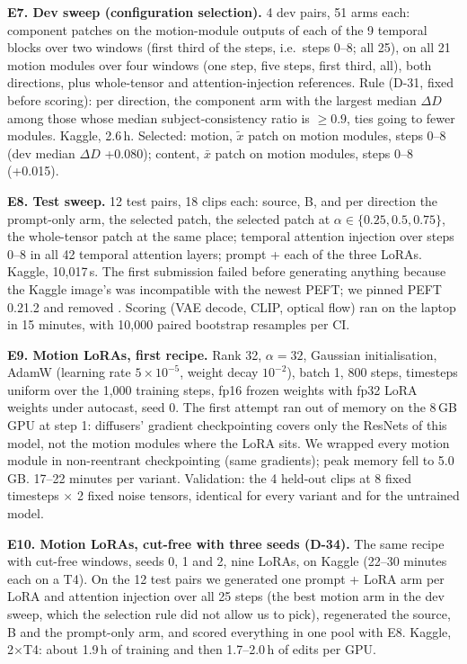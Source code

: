 \documentclass[twoside,english]{article}
\newcommand{\xs}{\bar{x}}         %
\newcommand{\xd}{\tilde{x}}       %
\newcommand{\dD}{\Delta D}
\begin{document}
\textbf{E7. Dev sweep (configuration selection).} 4 dev pairs, 51 arms each: component patches on
the motion-module outputs of each of the 9 temporal blocks over two windows (first third of the
steps, i.e.\ steps 0--8; all 25), on all 21 motion modules over four windows (one step, five steps,
first third, all), both directions, plus whole-tensor and attention-injection references. Rule
(D-31, fixed before scoring): per direction, the component arm with the largest median $\dD$
among those whose median subject-consistency ratio is $\ge 0.9$, ties going to fewer modules.
Kaggle, 2.6\,h. Selected: motion, $\xd$ patch on  motion modules, steps 0--8
(dev median $\dD$ +0.080); content, $\xs$ patch on  motion modules, steps
0--8 (+0.015).

\textbf{E8. Test sweep.} 12 test pairs, 18 clips each: source, B, and per direction the prompt-only
arm, the selected patch, the selected patch at $\alpha \in \{0.25, 0.5, 0.75\}$, the whole-tensor
patch at the same place; temporal attention injection over steps 0--8 in all 42 temporal attention
layers; prompt + each of the three LoRAs. Kaggle, 10{,}017\,s. The first submission failed before
generating anything because the Kaggle image's  was incompatible with the newest PEFT;
we pinned PEFT 0.21.2 and removed . Scoring (VAE decode, CLIP, optical flow) ran on the
laptop in 15 minutes, with 10{,}000 paired bootstrap resamples per CI.

\textbf{E9. Motion LoRAs, first recipe.} Rank 32, $\alpha=32$, Gaussian initialisation, AdamW
(learning rate $5\times10^{-5}$, weight decay $10^{-2}$), batch 1, 800 steps, timesteps uniform over
the 1{,}000 training steps, fp16 frozen weights with fp32 LoRA weights under autocast, seed 0. The
first attempt ran out of memory on the 8\,GB GPU at step 1: diffusers' gradient checkpointing
covers only the ResNets of this model, not the motion modules where the LoRA sits. We wrapped every
motion module in non-reentrant checkpointing (same gradients); peak memory fell to 5.0\,GB. 17--22
minutes per variant. Validation: the 4 held-out clips at 8 fixed timesteps $\times$ 2 fixed noise
tensors, identical for every variant and for the untrained model.

\textbf{E10. Motion LoRAs, cut-free with three seeds (D-34).} The same recipe with cut-free
windows, seeds 0, 1 and 2, nine LoRAs, on Kaggle (22--30 minutes each on a T4). On the 12 test
pairs we generated one prompt + LoRA arm per LoRA and attention injection over all 25 steps (the
best motion arm in the dev sweep, which the selection rule did not allow us to pick), regenerated
the source, B and the prompt-only arm, and scored everything in one pool with E8.
Kaggle, 2$\times$T4: about 1.9\,h of training and then 1.7--2.0\,h of edits per GPU.
\end{document}
